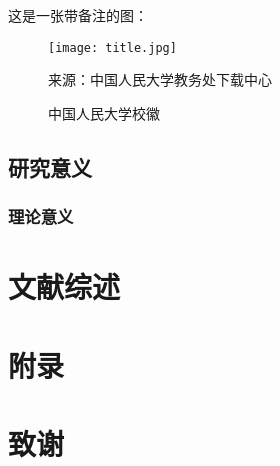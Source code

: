 \documentclass[12pt,UTF8]{ctexart}
\begin{document}
\begin{spacing}{1.25}
这是一张带备注的图：
\begin{figure}[H]
    \centering
    \texttt{[image: title.jpg]}
    \caption{中国人民大学校徽}
    \label{fig:age}
    {\fontsize{8pt}{10pt}\selectfont\parbox{0.7\textwidth}{来源：中国人民大学教务处下载中心}}
\end{figure}
\subsection{研究意义}
\subsubsection{理论意义}

\section{文献综述}


\newpage
\end{spacing}
\nocite{*}
\printbibliography[heading=bibliography,title=参考文献]
\newpage
{}
\section*{附录}
\appendix
\newpage
{}
\section*{致谢}
\end{document}
